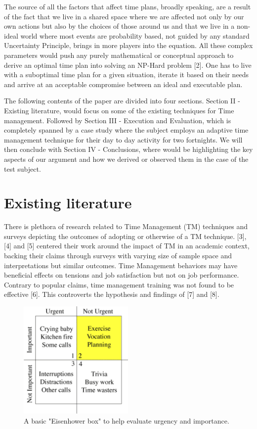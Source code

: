 \documentclass[conference]{IEEEtran}
\begin{document}
The source of all the factors that affect time plans, broadly speaking, are a result of the fact that we live in a shared space where we are affected not only by our own actions but also by the choices of those around us and that we live in a non-ideal world where most events are probability based, not guided by any standard Uncertainty Principle, brings in more players into the equation. All these complex parameters would push any purely mathematical or conceptual approach to derive an optimal time plan into solving an NP-Hard problem [2]. One has to live with a suboptimal time plan for a given situation, iterate it based on their needs and arrive at an acceptable compromise between an ideal and executable plan.

The following contents of the paper are divided into four sections. Section II - Existing literature, would focus on some of the existing techniques for Time management. Followed by Section III - Execution and Evaluation, which is completely spanned by a case study where the subject employs an adaptive time management technique for their day to day activity for two fortnights. We will then conclude with Section IV - Conclusions, where would be highlighting the key aspects of our argument and how we derived or observed them in the case of the test subject.

\section{Existing literature}
There is plethora of research related to Time Management (TM) techniques and surveys depicting the outcomes of adopting or otherwise of a TM technique. [3], [4] and [5] centered their work around the impact of TM in an academic context, backing their claims through surveys with varying size of sample space and interpretations but similar outcomes. Time Management behaviors may have beneficial effects on tensions and job satisfaction but not on job performance. Contrary to popular claims, time management training was not found to be effective [6]. This controverts the hypothesis and findings of [7] and [8].

\begin{figure}[hb]
  \centering
  \includegraphics[width=2.2in]{eisenhower}
  \caption[]
   {A basic "Eisenhower box" to help evaluate urgency and importance.}
\end{figure}
\end{document}
